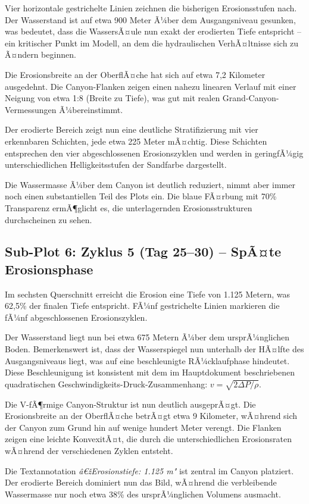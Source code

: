 ﻿\documentclass[12pt,a4paper]{report}
\begin{document}
Vier horizontale gestrichelte Linien zeichnen die bisherigen Erosionsstufen nach. Der Wasserstand ist auf etwa 900 Meter Ã¼ber dem Ausgangsniveau gesunken, was bedeutet, dass die WassersÃ¤ule nun exakt der erodierten Tiefe entspricht -- ein kritischer Punkt im Modell, an dem die hydraulischen VerhÃ¤ltnisse sich zu Ã¤ndern beginnen.

Die Erosionsbreite an der OberflÃ¤che hat sich auf etwa 7,2 Kilometer ausgedehnt. Die Canyon-Flanken zeigen einen nahezu linearen Verlauf mit einer Neigung von etwa 1:8 (Breite zu Tiefe), was gut mit realen Grand-Canyon-Vermessungen Ã¼bereinstimmt.

Der erodierte Bereich zeigt nun eine deutliche Stratifizierung mit vier erkennbaren Schichten, jede etwa 225 Meter mÃ¤chtig. Diese Schichten entsprechen den vier abgeschlossenen Erosionszyklen und werden in geringfÃ¼gig unterschiedlichen Helligkeitsstufen der Sandfarbe dargestellt.

Die Wassermasse Ã¼ber dem Canyon ist deutlich reduziert, nimmt aber immer noch einen substantiellen Teil des Plots ein. Die blaue FÃ¤rbung mit 70\% Transparenz ermÃ¶glicht es, die unterlagernden Erosionsstrukturen durchscheinen zu sehen.

\subsection{Sub-Plot 6: Zyklus 5 (Tag 25--30) -- SpÃ¤te Erosionsphase}

Im sechsten Querschnitt erreicht die Erosion eine Tiefe von 1.125 Metern, was 62,5\% der finalen Tiefe entspricht. FÃ¼nf gestrichelte Linien markieren die fÃ¼nf abgeschlossenen Erosionszyklen.

Der Wasserstand liegt nun bei etwa 675 Metern Ã¼ber dem ursprÃ¼nglichen Boden. Bemerkenswert ist, dass der Wasserspiegel nun unterhalb der HÃ¤lfte des Ausgangsniveaus liegt, was auf eine beschleunigte RÃ¼cklaufphase hindeutet. Diese Beschleunigung ist konsistent mit dem im Hauptdokument beschriebenen quadratischen Geschwindigkeits-Druck-Zusammenhang: $v = \sqrt{2\Delta P / \rho}$.

Die V-fÃ¶rmige Canyon-Struktur ist nun deutlich ausgeprÃ¤gt. Die Erosionsbreite an der OberflÃ¤che betrÃ¤gt etwa 9 Kilometer, wÃ¤hrend sich der Canyon zum Grund hin auf wenige hundert Meter verengt. Die Flanken zeigen eine leichte KonvexitÃ¤t, die durch die unterschiedlichen Erosionsraten wÃ¤hrend der verschiedenen Zyklen entsteht.

Die Textannotation \textit{â€žErosionstiefe: 1.125 m"} ist zentral im Canyon platziert. Der erodierte Bereich dominiert nun das Bild, wÃ¤hrend die verbleibende Wassermasse nur noch etwa 38\% des ursprÃ¼nglichen Volumens ausmacht.
\end{document}
